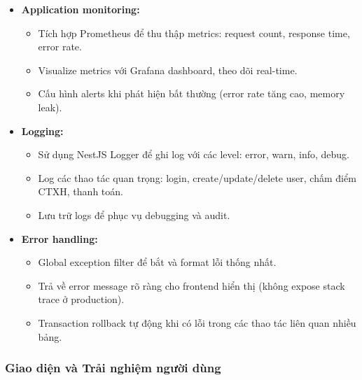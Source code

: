 \begin{itemize}
    \item \textbf{Application monitoring:}
    \begin{itemize}
        \item Tích hợp Prometheus để thu thập metrics: request count, response time, error rate.
        \item Visualize metrics với Grafana dashboard, theo dõi real-time.
        \item Cấu hình alerts khi phát hiện bất thường (error rate tăng cao, memory leak).
    \end{itemize}
    
    \item \textbf{Logging:}
    \begin{itemize}
        \item Sử dụng NestJS Logger để ghi log với các level: error, warn, info, debug.
        \item Log các thao tác quan trọng: login, create/update/delete user, chấm điểm CTXH, thanh toán.
        \item Lưu trữ logs để phục vụ debugging và audit.
    \end{itemize}
    
    \item \textbf{Error handling:}
    \begin{itemize}
        \item Global exception filter để bắt và format lỗi thống nhất.
        \item Trả về error message rõ ràng cho frontend hiển thị (không expose stack trace ở production).
        \item Transaction rollback tự động khi có lỗi trong các thao tác liên quan nhiều bảng.
    \end{itemize}
\end{itemize}

\subsubsection{Giao diện và Trải nghiệm người dùng}

